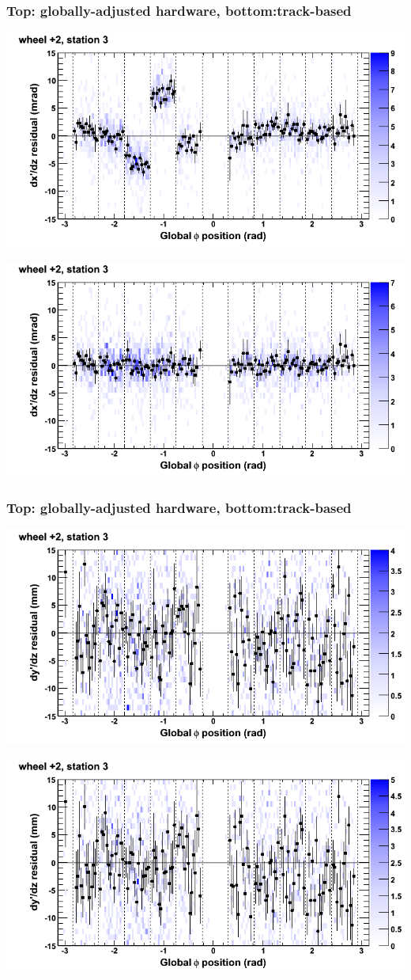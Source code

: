 \documentclass[compress]{beamer}
\begin{document}
\begin{frame}
\frametitle{Top: globally-adjusted hardware, bottom:track-based}
\includegraphics[width=0.7\linewidth]{NOV4_mapplots_HW/DTvsphi_st3whE_dxdz.png}

\includegraphics[width=0.7\linewidth]{NOV4_mapplots/DTvsphi_st3whE_dxdz.png}
\end{frame}

\begin{frame}
\frametitle{Top: globally-adjusted hardware, bottom:track-based}
\includegraphics[width=0.7\linewidth]{NOV4_mapplots_HW/DTvsphi_st3whE_dydz.png}

\includegraphics[width=0.7\linewidth]{NOV4_mapplots/DTvsphi_st3whE_dydz.png}
\end{frame}
\end{document}
